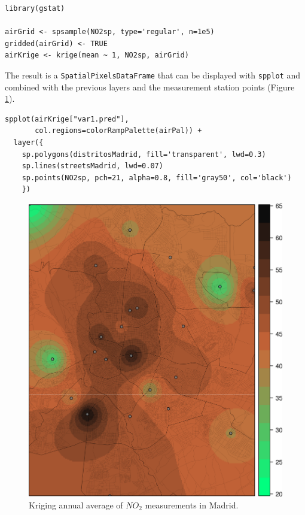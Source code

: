 
\lstset{language=R,numbers=none}
\begin{lstlisting}
library(gstat)

airGrid <- spsample(NO2sp, type='regular', n=1e5)
gridded(airGrid) <- TRUE
airKrige <- krige(mean ~ 1, NO2sp, airGrid)
\end{lstlisting}

The result is a \texttt{SpatialPixelsDataFrame} that can be displayed with
\texttt{spplot} and combined with the previous layers and the measurement
station points (Figure \ref{fig:airMadrid_krige}).


\lstset{language=R,numbers=none}
\begin{lstlisting}
spplot(airKrige["var1.pred"],
       col.regions=colorRampPalette(airPal)) +
  layer({
    sp.polygons(distritosMadrid, fill='transparent', lwd=0.3)
    sp.lines(streetsMadrid, lwd=0.07)
    sp.points(NO2sp, pch=21, alpha=0.8, fill='gray50', col='black')
    })
\end{lstlisting}

\begin{figure}[htb]
\centering
\includegraphics[width=.9\linewidth]{figs/airMadrid_krige.png}
\caption{\label{fig:airMadrid_krige}Kriging annual average of $NO_2$ measurements in Madrid.}
\end{figure}
